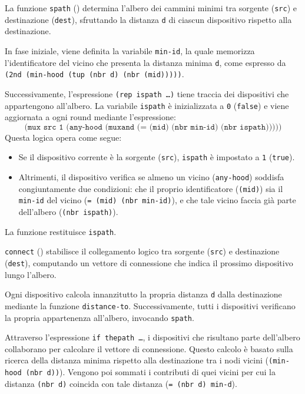La funzione \texttt{spath} () determina l'albero dei cammini minimi tra sorgente (\texttt{src}) e destinazione (\texttt{dest}), sfruttando la distanza \texttt{d} di ciascun dispositivo rispetto alla destinazione.

In fase iniziale, viene definita la variabile \texttt{min-id}, la quale memorizza l'identificatore del vicino che presenta la distanza minima \texttt{d}, come espresso da \texttt{(2nd (min-hood (tup (nbr d) (nbr (mid)))))}.

Successivamente, l'espressione \texttt{(rep ispath \dots)} tiene traccia dei dispositivi che appartengono all'albero. La variabile \texttt{ispath} è inizializzata a \texttt{0} (\texttt{false}) e viene aggiornata a ogni round mediante l'espressione:
\[
\texttt{(mux src 1 (any-hood (muxand (= (mid) (nbr min-id) (nbr ispath)))))}
\]
Questa logica opera come segue:
\begin{itemize}
    \item Se il dispositivo corrente è la sorgente (\texttt{src}), \texttt{ispath} è impostato a \texttt{1} (\texttt{true}).
    \item Altrimenti, il dispositivo verifica se almeno un vicino (\texttt{any-hood}) soddisfa congiuntamente due condizioni: che il proprio identificatore (\texttt{(mid)}) sia il \texttt{min-id} del vicino (\texttt{= (mid) (nbr min-id)}), e che tale vicino faccia già parte dell'albero (\texttt{(nbr ispath)}).
\end{itemize}

La funzione restituisce \texttt{ispath}.
%
\newpage


\texttt{connect} () stabilisce il collegamento logico tra sorgente (\texttt{src}) e destinazione (\texttt{dest}), computando un vettore di connessione che indica il prossimo dispositivo lungo l'albero.

Ogni dispositivo calcola innanzitutto la propria distanza \texttt{d} dalla destinazione mediante la funzione \texttt{distance-to}. Successivamente, tutti i dispositivi verificano la propria appartenenza all'albero, invocando \texttt{spath}.

Attraverso l'espressione \texttt{if thepath \dots}, i dispositivi che risultano parte dell'albero collaborano per calcolare il vettore di connessione. Questo calcolo è basato sulla ricerca della distanza minima rispetto alla destinazione tra i nodi vicini (\texttt{(min-hood (nbr d))}). Vengono poi sommati i contributi di quei vicini per cui la distanza \texttt{(nbr d)} coincida con tale distanza (\texttt{= (nbr d) min-d}).

